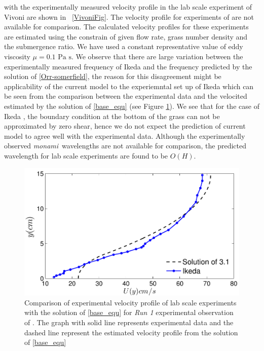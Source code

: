 \documentclass[12pt]{report}   %
\newcommand{\monami}{\textit{monami}}
\begin{document}
with the experimentally measured velocity profile in the lab scale experiment of Vivoni \cite{Vivoni98} are shown in ~\ref{VivoniFig}. The velocity profile for experiments of \cite{Ghisal02} are not available for comparison. The calculated velocity profiles for these experiments are estimated using the constrain of given flow rate, grass number density and the submergence ratio. We have used a constant representative value of eddy viscosity $\mu =  \text{0.1 Pa s}$. We observe that there are large variation between the experimentally measured frequency of Ikeda \cite{Ikeda96} and the  frequency predicted by the solution of \ref{Orr-somerfield}, the reason for this disagreement might be applicability of the current model to the experiemntal set up of Ikeda \cite{Ikeda96} which can be seen from the comparison between the experimental data and the velocited estimated by the solution of \ref{base_equ} (see Figure \ref{IkedaMatching}). We see that for the case of Ikeda \cite{Ikeda96}, the boundary condition at the 
bottom of the grass can not be approximated by zero shear, hence we do not expect the prediction of current model to agree well with the experimental data.
Although the experimentally observed \monami ~wavelengths are not available for comparison, the predicted wavelength for lab scale experiments \citep{Ghisal02} are found to be $O(H)$.
\begin{figure}
 \includegraphics{Ikeda_zero_shear_match}
 \caption{ Comparison of experimental velocity profile of lab scale experiments with the solution of \eqref{base_equ} for \textit{Run 1 } experimental observation of \cite{Ikeda96}. The graph with solid line represents experimental data and the dashed line represent the estimated velocity profile from the solution of \eqref{base_equ}    }
 \label{IkedaMatching}
\end{figure}
\end{document}
